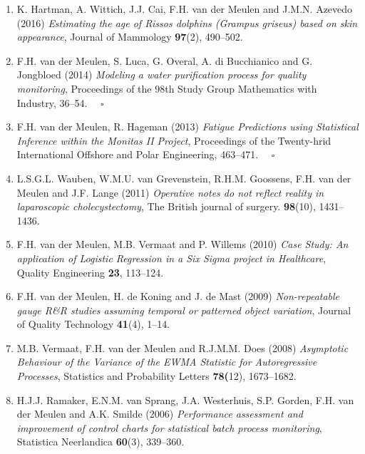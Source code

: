 \documentclass[
10pt, %
a4paper, %
oneside, %
headinclude,footinclude, %
BCOR5mm, %
]{scrartcl}
\begin{document}
\begin{enumerate}
\item {\sc K. Hartman, A. Wittich, J.J. Cai, F.H. van der Meulen and J.M.N. Azevedo (2016)} {\it  Estimating the age of Rissos dolphins (Grampus griseus) based on skin appearance},  Journal of Mammology {\bf 97}(2), 490--502.

\item {\sc F.H. van der Meulen, S. Luca, G. Overal, A. di Bucchianico and G. Jongbloed (2014)} {\it  Modeling a water purification process for quality monitoring}, Proceedings of the 98th Study Group Mathematics with Industry, 36--54.\hspace*{\fill}  $\quad \square$

\item {\sc F.H. van der Meulen, R. Hageman (2013)} {\it  Fatigue Predictions using Statistical Inference within the Monitas II Project}, Proceedings of the Twenty-hrid International Offshore and Polar Engineering, 463--471.\hspace*{\fill}  $\quad \square$

\item {\sc L.S.G.L. Wauben, W.M.U. van Grevenstein, R.H.M. Goossens, F.H. van der Meulen and J.F. Lange (2011)} {\it  Operative notes do not reflect reality in laparoscopic cholecystectomy}, The British journal of surgery. {\bf 98}(10), 1431--1436.

\item {\sc F.H. van der Meulen, M.B. Vermaat and P. Willems (2010)} {\it  Case Study: An application of Logistic Regression in a Six Sigma project in Healthcare}, Quality Engineering {\bf 23}, 113--124.

\item {\sc F.H. van der Meulen, H. de Koning and J. de Mast (2009)} {\it   Non-repeatable gauge R\&R studies assuming temporal or patterned object variation}, Journal of Quality Technology {\bf 41}(4), 1--14.

\item {\sc M.B. Vermaat, F.H. van der Meulen and R.J.M.M. Does (2008)} {\it  Asymptotic Behaviour of the Variance of the EWMA Statistic for Autoregressive Processes}, Statistics and Probability Letters {\bf 78(}12), 1673--1682.

\item {\sc H.J.J. Ramaker, E.N.M. van Sprang, J.A. Westerhuis, S.P. Gorden, F.H. van der Meulen and A.K. Smilde (2006)} {\it  Performance assessment and improvement of control charts for statistical batch process monitoring},  Statistica Neerlandica {\bf 60}(3), 339--360.

\end{enumerate}
\end{document}
